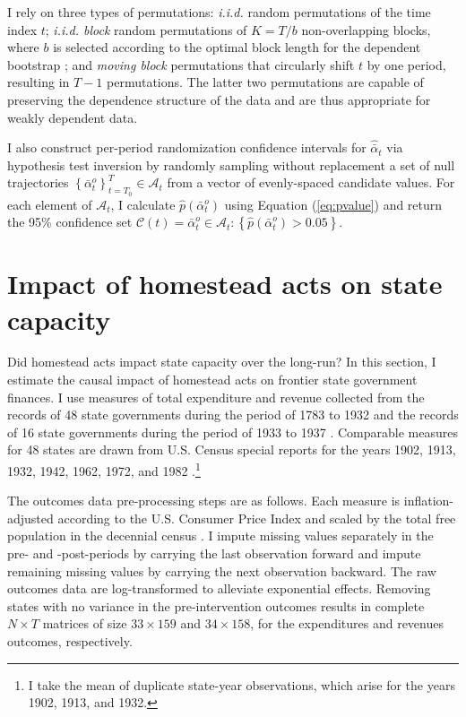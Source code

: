 \documentclass[12pt]{article}
\begin{document}
I rely on three types of permutations: \emph{i.i.d.} random permutations of the time index $t$; \emph{i.i.d. block} random permutations of $K=T/b$ non-overlapping blocks, where $b$ is selected according to the optimal block length for the dependent bootstrap \citep{politis2004automatic}; and \emph{moving block} permutations that circularly shift $t$ by one period, resulting in $T-1$ permutations. The latter two permutations are capable of preserving the dependence structure of the data and are thus appropriate for weakly dependent data. 

I also construct per-period randomization confidence intervals for $\hat{\bar{\alpha}}_{t}$ via hypothesis test inversion by randomly sampling without replacement a set of null trajectories $\left\{\bar{\alpha}^{o}_{t}\right\}_{t=T_0}^T \in \mathcal{A}_t$ from a vector of evenly-spaced candidate values. For each element of $\mathcal{A}_t$, I calculate $\hat{p} (\bar{\alpha}^{o}_{t})$ using Equation (\ref{eq:pvalue}) and return the 95\% confidence set $\mathcal{C} (t) = \bar{\alpha}^{o}_{t} \in \mathcal{A}_t: \left\{\hat{p} (\bar{\alpha}^{o}_{t}) > 0.05\right\}$. 

\section{Impact of homestead acts on state capacity} \label{state-capacity}

Did homestead acts impact state capacity over the long-run? In this section, I estimate the causal impact of homestead acts on frontier state government finances. I use measures of total expenditure and revenue collected from the records of 48 state governments during the period of 1783 to 1932 \citep{sylla1993sources} and the records of 16 state governments during the period of 1933 to 1937 \citep{sylla1995sourcesa,sylla1995sourcesb}. Comparable measures for 48 states are drawn from U.S. Census special reports for the years 1902, 1913, 1932, 1942, 1962, 1972, and 1982 \citep{haines2010}.\footnote{I take the mean of duplicate state-year observations, which arise for the years 1902, 1913, and 1932.}%

The outcomes data pre-processing steps are as follows. Each measure is inflation-adjusted according to the U.S. Consumer Price Index \citep{williamson2017seven} and scaled by the total free population in the decennial census \citep{haines2010}. I impute missing values separately in the pre- and -post-periods by carrying the last observation forward and impute remaining missing values by carrying the next observation backward. The raw outcomes data are log-transformed to alleviate exponential effects. Removing states with no variance in the pre-intervention outcomes results in complete $N \times T$ matrices of size $33 \times 159$ and $34 \times 158$, for the expenditures and revenues outcomes, respectively. 
\end{document}
